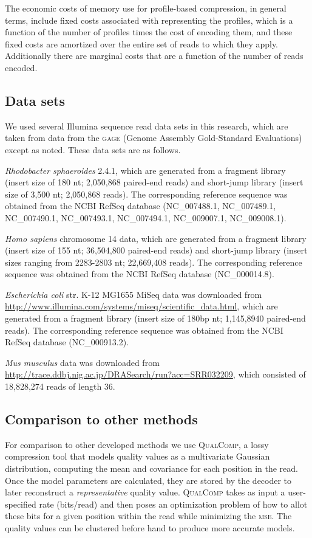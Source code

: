 \documentclass{bioinfo}
\begin{document}
\begin{methods}
The economic costs of memory use for profile-based compression, in
general terms, include fixed costs associated with representing the
profiles, which is a function of the number of profiles times the cost
of encoding them, and these fixed costs are amortized over the entire
set of reads to which they apply. Additionally there are marginal
costs that are a function of the number of reads encoded.

\subsection{Data sets}

We used several Illumina sequence read data sets in this research,
which are taken from data from the \textsc{gage} (Genome Assembly
Gold-Standard Evaluations)~\citep{Salzberg:2012rc} except as
noted. These data sets are as follows.

\textit{Rhodobacter sphaeroides} 2.4.1, which are generated from a
fragment library (insert size of 180 nt; 2,050,868 paired-end reads)
and short-jump library (insert size of 3,500 nt; 2,050,868 reads). The
corresponding reference sequence was obtained from the NCBI RefSeq
database (NC\_007488.1, NC\_007489.1, NC\_007490.1, NC\_007493.1,
NC\_007494.1, NC\_009007.1, NC\_009008.1).

\textit{Homo sapiens} chromosome 14 data, which are generated from a
fragment library (insert size of 155 nt; 36,504,800 paired-end reads)
and short-jump library (insert sizes ranging from 2283-2803 nt;
22,669,408 reads). The corresponding reference sequence was obtained
from the NCBI RefSeq database (NC\_000014.8).

\textit{Escherichia coli} str. K-12 MG1655 MiSeq data was downloaded
from \url{http://www.illumina.com/systems/miseq/scientific_data.html},
which are generated from a fragment library (insert size of 180bp nt;
1,145,8940 paired-end reads). The corresponding reference sequence was
obtained from the NCBI RefSeq database (NC\_000913.2).

\textit{Mus musculus} data was downloaded from
\url{http://trace.ddbj.nig.ac.jp/DRASearch/run?acc=SRR032209}, which
consisted of 18,828,274 reads of length 36.

\subsection{Comparison to other methods}

For comparison to other developed methods we use \textsc{QualComp}, a
lossy compression tool that models quality values as a multivariate
Gaussian distribution, computing the mean and covariance for each
position in the read\citep{Ochoa:2013rt}. Once the model parameters
are calculated, they are stored by the decoder to later reconstruct a
\emph{representative} quality value.  \textsc{QualComp} takes as input
a user-specified rate (bits/read) and then poses an optimization
problem of how to allot these bits for a given position within the
read while minimizing the \textsc{mse}. The quality values can be
clustered before hand to produce more accurate models.


\end{methods}
\end{document}
